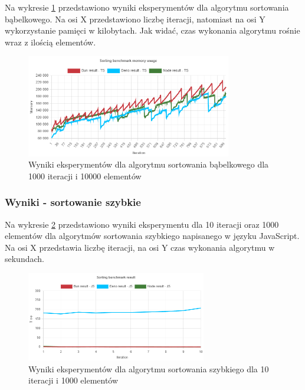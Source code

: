Na wykresie \ref{fig:bubble_sorting_e6_memory_ts} przedstawiono wyniki eksperymentów dla algorytmu sortowania bąbelkowego. Na osi X przedstawiono liczbę iteracji, natomiast na osi Y wykorzystanie pamięci w kilobytach. Jak widać, czas wykonania algorytmu rośnie wraz z ilością elementów.
\begin{figure}[H]
  \centering
  \includegraphics[width=0.8\textwidth]{Figures/sorting/bubble/e6_memory_ts.png}
  \caption{Wyniki eksperymentów dla algorytmu sortowania bąbelkowego dla 1000 iteracji i 10000 elementów}
  \label{fig:bubble_sorting_e6_memory_ts}
\end{figure}

\subsubsection{Wyniki - sortowanie szybkie}
Na wykresie \ref{fig:quick_sorting_e1_js} przedstawiono wyniki eksperymentu dla 10 iteracji oraz 1000 elementów dla algorytmów sortowania szybkiego napisanego w języku JavaScript. Na osi X przedstawia liczbę iteracji, na osi Y czas wykonania algorytmu w sekundach. 

\begin{figure}[H]
  \centering
  \includegraphics[width=0.7\textwidth]{Figures/sorting/quick/e1_js.png}
  \caption{Wyniki eksperymentów dla algorytmu sortowania szybkiego dla 10 iteracji i 1000 elementów}
  \label{fig:quick_sorting_e1_js}
\end{figure}

